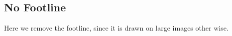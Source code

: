 \begingroup
{}
\subsection{No Footline}
\begin{iframe}
    Here we remove the footline, since it is drawn on large images other wise. 
\end{iframe}
\endgroup